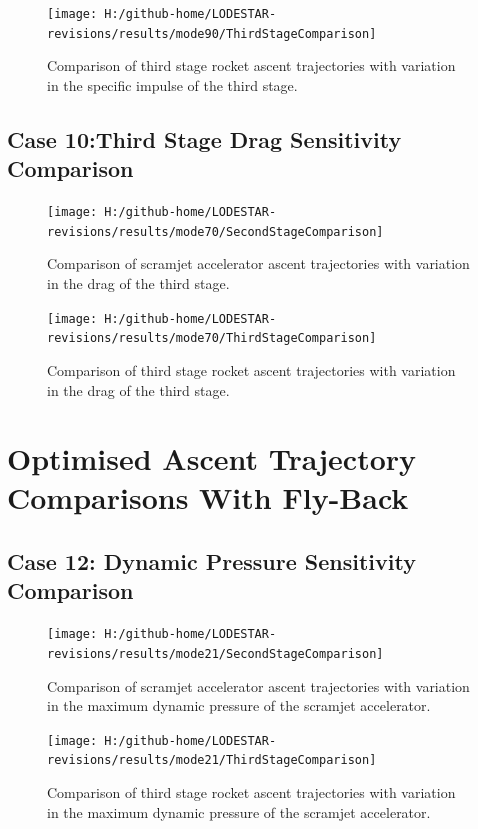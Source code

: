 \begin{figure}[!th]
\centering
\texttt{[image: H:/github-home/LODESTAR-revisions/results/mode90/ThirdStageComparison]}
\caption{Comparison of third stage rocket ascent trajectories with variation in the specific impulse of the third stage.}
\label{fig:ThirdStageComparison7}
\end{figure}
\FloatBarrier
\clearpage
\subsection{Case 10:Third Stage Drag Sensitivity Comparison}\label{sec:app_comparison70}

\begin{figure}[!th]
\centering
\texttt{[image: H:/github-home/LODESTAR-revisions/results/mode70/SecondStageComparison]}
\caption{Comparison of scramjet accelerator ascent trajectories with variation in the drag of the third stage.}
\label{fig:SecondStageComparison8}
\end{figure}


\begin{figure}[!th]
\centering
\texttt{[image: H:/github-home/LODESTAR-revisions/results/mode70/ThirdStageComparison]}
\caption{Comparison of third stage rocket ascent trajectories with variation in the drag of the third stage.}
\label{fig:ThirdStageComparison8}
\end{figure}

\FloatBarrier
\clearpage
\section{Optimised Ascent Trajectory Comparisons With Fly-Back}
\FloatBarrier
\subsection{Case 12: Dynamic Pressure Sensitivity Comparison}\label{sec:app_comparison21}
\begin{figure}[!th]
\centering
\texttt{[image: H:/github-home/LODESTAR-revisions/results/mode21/SecondStageComparison]}
\caption{Comparison of scramjet accelerator ascent trajectories with variation in the maximum dynamic pressure of the scramjet accelerator.}
\label{fig:SecondStageComparison9}
\end{figure}

\begin{figure}[!th]
\centering
\texttt{[image: H:/github-home/LODESTAR-revisions/results/mode21/ThirdStageComparison]}
\caption{Comparison of third stage rocket ascent trajectories with variation in the maximum dynamic pressure of the scramjet accelerator.}
\label{fig:ThirdStageComparison9}
\end{figure}

